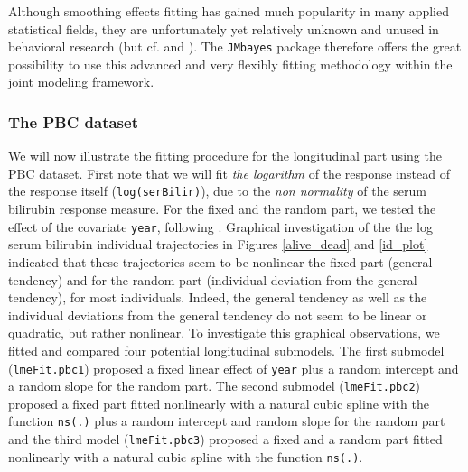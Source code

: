 \documentclass[12pt]{article}
\begin{document}
Although smoothing effects fitting has gained much popularity in many applied statistical fields, they are unfortunately yet relatively unknown and unused in behavioral research (but cf. \cite{Shadish2013} and \cite{Ghisletta_2018}). The \texttt{JMbayes} package therefore offers the great possibility to use this advanced and very flexibly fitting methodology within the joint modeling framework.


\subsubsection{The PBC dataset}
\label{long_pbc}
We will now illustrate the fitting procedure for the longitudinal part using the PBC dataset. First note that we will fit \textit{the logarithm} of the response instead of the response itself (\texttt{log(serBilir)}), due to the \textit{non normality} of the serum bilirubin response measure. For the fixed and the random part, we tested the effect of the covariate \texttt{year}, following \cite{JMbayes}. Graphical investigation of the the log serum bilirubin individual trajectories in Figures \ref{alive_dead} and \ref{id_plot} indicated that these trajectories seem to be nonlinear the fixed part (general tendency) and for the random part (individual deviation from the general tendency), for most individuals. Indeed, the general tendency as well as the individual deviations from the general tendency do not seem to be linear or quadratic, but rather nonlinear. To investigate this graphical observations, we fitted and compared four potential longitudinal submodels. The first submodel (\texttt{lmeFit.pbc1}) proposed a fixed linear effect of \texttt{year} plus a random intercept and a random slope for the random part. The second submodel (\texttt{lmeFit.pbc2}) proposed a fixed part fitted nonlinearly with a natural cubic spline with the function \texttt{ns(.)} plus a random intercept and random slope for the random part and the third model (\texttt{lmeFit.pbc3}) proposed a fixed and a random part fitted nonlinearly with a natural cubic spline with the function \texttt{ns(.)}.
\end{document}

